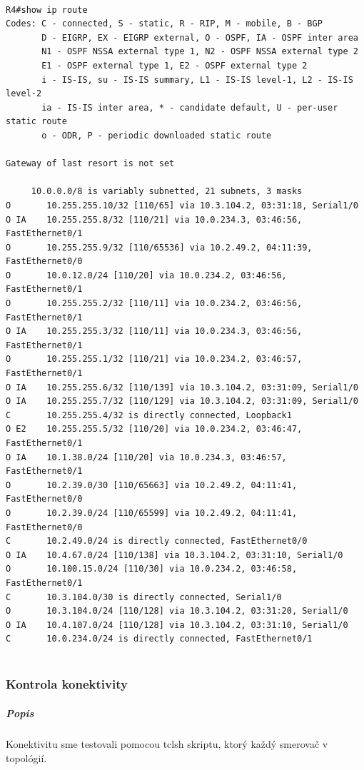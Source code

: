\documentclass[12pt,twoside,a4paper]{article}
\begin{document}
\noindent
{\selectfont
\begin{small}
\begin{verbatim}

R4#show ip route
Codes: C - connected, S - static, R - RIP, M - mobile, B - BGP
       D - EIGRP, EX - EIGRP external, O - OSPF, IA - OSPF inter area 
       N1 - OSPF NSSA external type 1, N2 - OSPF NSSA external type 2
       E1 - OSPF external type 1, E2 - OSPF external type 2
       i - IS-IS, su - IS-IS summary, L1 - IS-IS level-1, L2 - IS-IS level-2
       ia - IS-IS inter area, * - candidate default, U - per-user static route
       o - ODR, P - periodic downloaded static route

Gateway of last resort is not set

     10.0.0.0/8 is variably subnetted, 21 subnets, 3 masks
O       10.255.255.10/32 [110/65] via 10.3.104.2, 03:31:18, Serial1/0
O IA    10.255.255.8/32 [110/21] via 10.0.234.3, 03:46:56, FastEthernet0/1
O       10.255.255.9/32 [110/65536] via 10.2.49.2, 04:11:39, FastEthernet0/0
O       10.0.12.0/24 [110/20] via 10.0.234.2, 03:46:56, FastEthernet0/1
O       10.255.255.2/32 [110/11] via 10.0.234.2, 03:46:56, FastEthernet0/1
O IA    10.255.255.3/32 [110/11] via 10.0.234.3, 03:46:56, FastEthernet0/1
O       10.255.255.1/32 [110/21] via 10.0.234.2, 03:46:57, FastEthernet0/1
O IA    10.255.255.6/32 [110/139] via 10.3.104.2, 03:31:09, Serial1/0
O IA    10.255.255.7/32 [110/129] via 10.3.104.2, 03:31:09, Serial1/0
C       10.255.255.4/32 is directly connected, Loopback1
O E2    10.255.255.5/32 [110/20] via 10.0.234.2, 03:46:47, FastEthernet0/1
O IA    10.1.38.0/24 [110/20] via 10.0.234.3, 03:46:57, FastEthernet0/1
O       10.2.39.0/30 [110/65663] via 10.2.49.2, 04:11:41, FastEthernet0/0
O       10.2.39.0/24 [110/65599] via 10.2.49.2, 04:11:41, FastEthernet0/0
C       10.2.49.0/24 is directly connected, FastEthernet0/0
O IA    10.4.67.0/24 [110/138] via 10.3.104.2, 03:31:10, Serial1/0
O       10.100.15.0/24 [110/30] via 10.0.234.2, 03:46:58, FastEthernet0/1
C       10.3.104.0/30 is directly connected, Serial1/0
O       10.3.104.0/24 [110/128] via 10.3.104.2, 03:31:20, Serial1/0
O IA    10.4.107.0/24 [110/128] via 10.3.104.2, 03:31:10, Serial1/0
C       10.0.234.0/24 is directly connected, FastEthernet0/1


\end{verbatim}
\end{small}
}




\subsubsection*{Kontrola konektivity}
\subparagraph{Popis}
\subparagraph{}
Konektivitu sme testovali pomocou tclsh skriptu, ktorý  každý smerovač v topológií.
\end{document}

